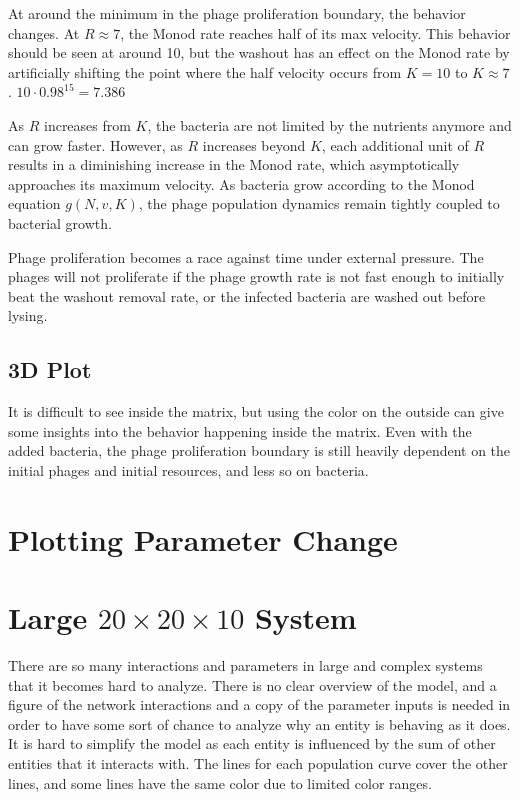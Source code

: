 At around the minimum in the phage proliferation boundary, the behavior changes. 
At $R\approx 7$, the Monod rate reaches half of its max velocity. 
This behavior should be seen at around 10, but the washout has an effect on the Monod rate by artificially shifting the point where the half velocity occurs from $K=10$ to $K\approx 7$. 
$10\cdot 0.98^{15} = 7.386$



As $R$ increases from $K$, the bacteria are not limited by the nutrients anymore and can grow faster. 
However, as $R$ increases beyond $K$, each additional unit of $R$ results in a diminishing increase in the Monod rate, which asymptotically approaches its maximum velocity. 
As bacteria grow according to the Monod equation $g(N, v, K)$, the phage population dynamics remain tightly coupled to bacterial growth. 

Phage proliferation becomes a race against time under external pressure. 
The phages will not proliferate if the phage growth rate is not fast enough to initially beat the washout removal rate, or the infected bacteria are washed out before lysing. 

\subsection{3D Plot}
It is difficult to see inside the matrix, but using the color on the outside can give some insights into the behavior happening inside the matrix. 
Even with the added bacteria, the phage proliferation boundary is still heavily dependent on the initial phages and initial resources, and less so on bacteria. 

\section{Plotting Parameter Change}

\section{Large $20\times20\times10$ System}
There are so many interactions and parameters in large and complex systems that it becomes hard to analyze. 
There is no clear overview of the model, and a figure of the network interactions and a copy of the parameter inputs is needed in order to have some sort of chance to analyze why an entity is behaving as it does. 
It is hard to simplify the model as each entity is influenced by the sum of other entities that it interacts with. 
The lines for each population curve cover the other lines, and some lines have the same color due to limited color ranges. 

